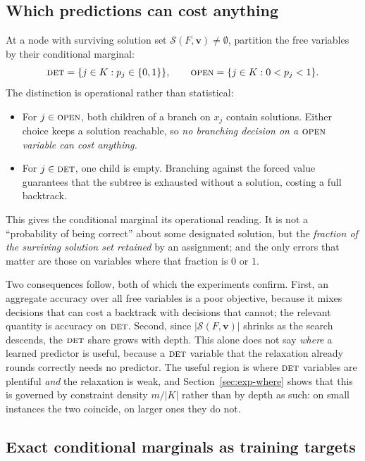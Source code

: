 \documentclass[preprint,12pt]{elsarticle}
\newcommand{\SOL}{\mathcal{S}}
\newcommand{\FORCED}{\textsc{det}}
\newcommand{\FREE}{\textsc{open}}
\begin{document}
\subsection{Which predictions can cost anything}
\label{sec:method-partition}

At a node with surviving solution set $\SOL(F,\mathbf{v})\ne\emptyset$, partition the free variables by their conditional marginal:
\begin{equation}
\FORCED = \{j\in K : p_j\in\{0,1\}\},
\qquad
\FREE = \{j\in K : 0<p_j<1\}.
\end{equation}
The distinction is operational rather than statistical:

\begin{itemize}
\item For $j\in\FREE$, both children of a branch on $x_j$ contain solutions. Either choice keeps a solution reachable, so \emph{no branching decision on a $\FREE$ variable can cost anything.}
\item For $j\in\FORCED$, one child is empty. Branching against the forced value guarantees that the subtree is exhausted without a solution, costing a full backtrack.
\end{itemize}

This gives the conditional marginal its operational reading. It is not a ``probability of being correct'' about some designated solution, but the \emph{fraction of the surviving solution set retained} by an assignment; and the only errors that matter are those on variables where that fraction is $0$ or $1$.

Two consequences follow, both of which the experiments confirm. First, an aggregate accuracy over all free variables is a poor objective, because it mixes decisions that can cost a backtrack with decisions that cannot; the relevant quantity is accuracy on $\FORCED$. Second, since $|\SOL(F,\mathbf{v})|$ shrinks as the search descends, the $\FORCED$ share grows with depth. This alone does not say \emph{where} a learned predictor is useful, because a $\FORCED$ variable that the relaxation already rounds correctly needs no predictor. The useful region is where $\FORCED$ variables are plentiful \emph{and} the relaxation is weak, and Section~\ref{sec:exp-where} shows that this is governed by constraint density $m/|K|$ rather than by depth as such: on small instances the two coincide, on larger ones they do not.

\subsection{Exact conditional marginals as training targets}
\label{sec:method-targets}
\label{sec:method-labels}
\end{document}
